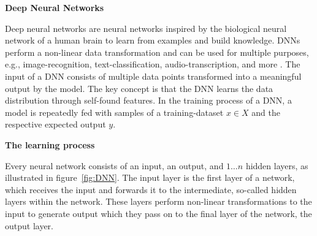 \textbf{Deep Neural Networks}

Deep neural networks are neural networks inspired by the biological neural network of a human brain to learn from examples and build knowledge. 
DNNs perform a non-linear data transformation and can be used for multiple purposes, e.g., image-recognition, text-classification, audio-transcription, and more \cite{rawat2017deep}.
The input of a DNN consists of multiple data points transformed into a meaningful output by the model. The key concept is that the DNN learns the data distribution through self-found features.
In the training process of a DNN, a model is repeatedly fed with samples of a training-dataset $x \in X$ and the respective expected output $y$.

\textbf{The learning process}

Every neural network consists of an input, an output, and $1\dots n$ hidden layers, as illustrated in figure~\ref{fig:DNN}.
The input layer is the first layer of a network, which receives the input and forwards it to the intermediate, so-called hidden layers within the network. These layers perform non-linear transformations to the input to generate output which they pass on to the final layer of the network, the output layer. 
